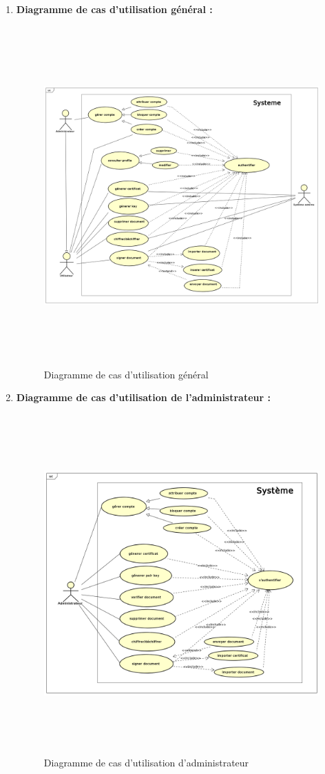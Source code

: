 				\begin{enumerate}
					\item \textbf{Diagramme de cas d'utilisation général :}
						\begin{figure}[H]
						\centering		
							\includegraphics[width=18cm, height=13cm]{../Diagrammes/DiagrammeDeCasDutilisation/diagrammeGeneral.png} 
						\caption{Diagramme de cas d'utilisation général}
						\label{diause1}
					\end{figure}
					\item \textbf{Diagramme de cas d'utilisation de l'administrateur :}
					\begin{figure}[H]
						\centering		
						\includegraphics[width=18cm, height=13cm]{../Diagrammes/DiagrammeDeCasDutilisation/admin.png}  
						\caption{Diagramme de cas d'utilisation d'administrateur}
						\label{diause2}
					\end{figure}
					

\end{enumerate}
